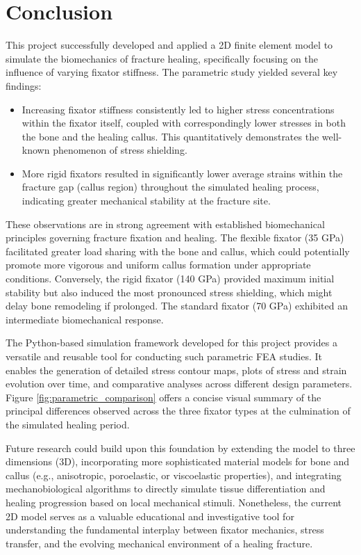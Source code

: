 \documentclass{article}
\begin{document}
\section{Conclusion}
This project successfully developed and applied a 2D finite element model to simulate the biomechanics of fracture healing, specifically focusing on the influence of varying fixator stiffness. The parametric study yielded several key findings:
\begin{itemize}
  \item Increasing fixator stiffness consistently led to higher stress concentrations within the fixator itself, coupled with correspondingly lower stresses in both the bone and the healing callus. This quantitatively demonstrates the well-known phenomenon of stress shielding.
  \item More rigid fixators resulted in significantly lower average strains within the fracture gap (callus region) throughout the simulated healing process, indicating greater mechanical stability at the fracture site.
\end{itemize}
These observations are in strong agreement with established biomechanical principles governing fracture fixation and healing. The flexible fixator (35 GPa) facilitated greater load sharing with the bone and callus, which could potentially promote more vigorous and uniform callus formation under appropriate conditions. Conversely, the rigid fixator (140 GPa) provided maximum initial stability but also induced the most pronounced stress shielding, which might delay bone remodeling if prolonged. The standard fixator (70 GPa) exhibited an intermediate biomechanical response.

The Python-based simulation framework developed for this project provides a versatile and reusable tool for conducting such parametric FEA studies. It enables the generation of detailed stress contour maps, plots of stress and strain evolution over time, and comparative analyses across different design parameters. Figure \ref{fig:parametric_comparison} offers a concise visual summary of the principal differences observed across the three fixator types at the culmination of the simulated healing period.

Future research could build upon this foundation by extending the model to three dimensions (3D), incorporating more sophisticated material models for bone and callus (e.g., anisotropic, poroelastic, or viscoelastic properties), and integrating mechanobiological algorithms to directly simulate tissue differentiation and healing progression based on local mechanical stimuli. Nonetheless, the current 2D model serves as a valuable educational and investigative tool for understanding the fundamental interplay between fixator mechanics, stress transfer, and the evolving mechanical environment of a healing fracture.
\end{document}
